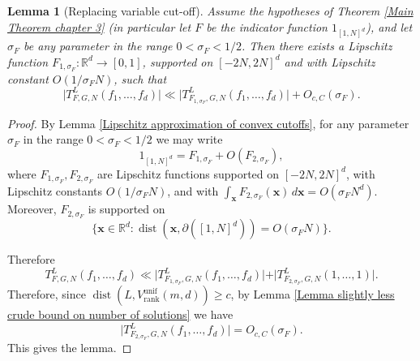 \documentclass[12pt,a4paper,twoside,reqno]{amsart}
\newtheorem{Lemma}[Theorem]{Lemma}
\newcommand{\rank}{\operatorname{rank}}
\newcommand{\dist}{\operatorname{dist}}
\newcommand{\unif}{\operatorname{unif}}
\numberwithin{equation}{section}
\begin{document}
\begin{Lemma}[Replacing variable cut-off]
\label{Lemma replacing F cut-off}
Assume the hypotheses of Theorem \ref{Main Theorem chapter 3} (in particular let $F$ be the indicator function $1_{[1,N]^d}$), and let $\sigma_F$ be any parameter in the range $0<\sigma_F<1/2$. Then there exists a Lipschitz function $F_{1,\sigma_F}:\mathbb{R}^d \longrightarrow [0,1]$, supported on $[-2N,2N]^d$ and with Lipschitz constant $O(1/\sigma_FN)$, such that \[\vert T_{F,G,N}^L(f_1,\dots,f_d)\vert \ll \vert T_{F_{1,\sigma_F},G,N}^L(f_1,\dots,f_d)\vert + O_{c,C}(\sigma_F).\]
\end{Lemma}

\begin{proof}
By Lemma \ref{Lipschitz approximation of convex cutoffs}, for any parameter $\sigma_F$ in the range $0< \sigma_F < 1/2$ we may write \[ 1_{[1,N]^d} = F_{1,\sigma_F} + O(F_{2,\sigma_F}),\] where $F_{1,\sigma_F},F_{2,\sigma_F}$ are Lipschitz functions supported on $[-2N,2N]^d$, with Lipschitz constants $O(1/\sigma_FN)$, and with $\int_\mathbf{x} F_{2,\sigma_F}(\mathbf{x}) \, d\mathbf{x} = O(\sigma_F N^d)$. Moreover, $F_{2,\sigma_F}$ is supported on \[ \{\mathbf{x} \in \mathbb{R}^d: \dist(\mathbf{x}, \partial ([1,N]^d)) = O(\sigma_F N)\}.\] 

Therefore \[T_{F,G,N}^L(f_1,\dots,f_d) \ll \vert T_{F_{1,\sigma_F},G,N}^L(f_1,\dots,f_d)\vert + \vert T_{F_{2,\sigma_F},G,N}^L(1,\dots,1)\vert.\] Therefore, since $\dist(L,V_{\rank}^{\unif}(m,d)) \geqslant c$, by Lemma \ref{Lemma slightly less crude bound on number of solutions} we have \[\vert T_{F_{2,\sigma_F},G,N}^L(f_1,\dots,f_d)\vert = O_{c,C}(\sigma_F).\] This gives the lemma.
\end{proof}
\end{document}
